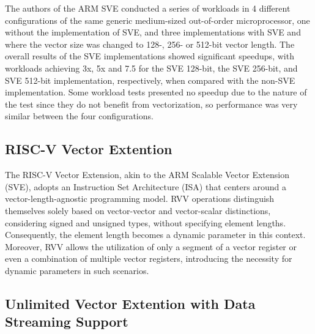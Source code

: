  The authors of the ARM SVE \cite{arm-paper} conducted a series of workloads in 4 different configurations of the same generic medium-sized out-of-order microprocessor, one without the implementation of SVE, and three implementations with SVE and where the vector size was changed to 128-, 256- or 512-bit vector length.
The overall results of the SVE implementations showed significant speedups, with workloads achieving 3x, 5x and 7.5 for the SVE 128-bit, the SVE 256-bit, and  SVE 512-bit implementation, respectively, when compared with the non-SVE implementation. Some workload tests presented no speedup due to the nature of the test since they do not benefit from vectorization, so performance was very similar between the four configurations.



\subsection{RISC-V Vector Extention}
\label{label:rvv}

The RISC-V Vector Extension, akin to the ARM Scalable Vector Extension (SVE), adopts an Instruction Set Architecture (ISA) that centers around a vector-length-agnostic programming model. RVV operations distinguish themselves solely based on vector-vector and vector-scalar distinctions, considering signed and unsigned types, without specifying element lengths. Consequently, the element length becomes a dynamic parameter in this context. Moreover, RVV allows the utilization of only a segment of a vector register or even a combination of multiple vector registers, introducing the necessity for dynamic parameters in such scenarios.




\subsection{Unlimited Vector Extention with Data Streaming Support}
\label{label:uve}





